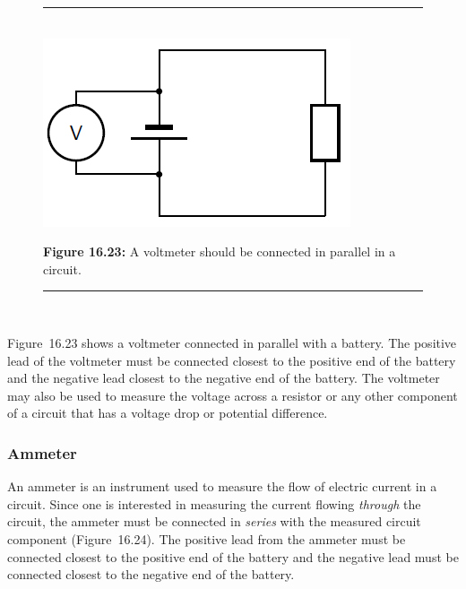 	\begin{figure}[H] %
    \begin{center}
    \rule[.1in]{\figurerulewidth}{.005in} \\
        \label{m38773*uid73!!!underscore!!!media}\label{m38773*uid73!!!underscore!!!printimage}\includegraphics[width=0.4\columnwidth]{col11305.imgs/m38773_PG10C9_034.png} %
        
      \vspace{2pt}
    \vspace{\rubberspace}\par \begin{cnxcaption}
	  \small \textbf{Figure 16.23: }A voltmeter should be connected in parallel in a circuit.
	\end{cnxcaption}
      
    \vspace{.1in}
    \rule[.1in]{\figurerulewidth}{.005in} \\
        
    \end{center}

 \end{figure}   

    \addtocounter{footnote}{-0}
    
        \label{m38773*id67678}Figure~16.23 shows a voltmeter connected
in parallel with a battery. The positive lead of the voltmeter must be connected closest to the positive end of the battery and the negative lead closest to the negative end of the battery. The voltmeter may also be used to measure the
voltage across a resistor or any other component of a circuit that has a voltage drop or potential difference.\par 
      
      \label{m38773*uid74}
            \subsubsection{ Ammeter}
            \nopagebreak
            
        
        \label{m38773*id62484}An ammeter is an instrument used to measure the flow of electric
current in a circuit. Since one is interested in measuring the
current flowing \textsl{through} the circuit, the ammeter
must be connected in \textsl{series} with the measured circuit
component (Figure~16.24). The positive lead from the ammeter must be connected closest to the positive end of the battery and the negative lead must be connected closest to the negative end of the battery.\par 
        
